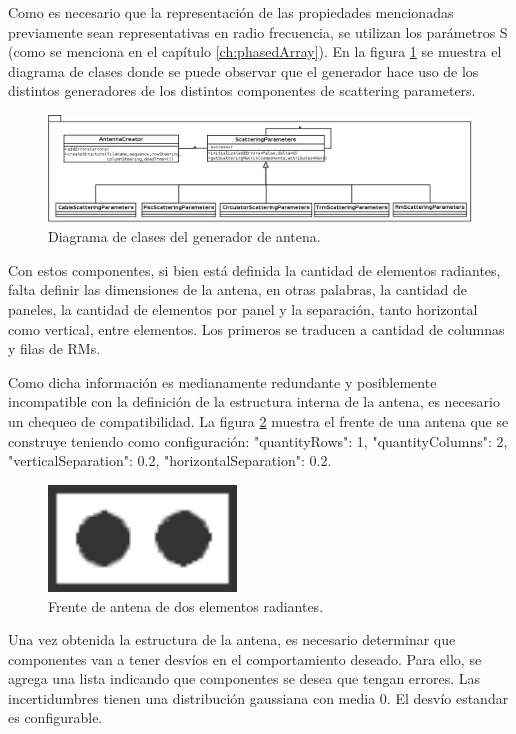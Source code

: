 Como es necesario que la representación de las propiedades mencionadas previamente sean representativas en radio frecuencia,
se utilizan los parámetros S (como se menciona en el capítulo \ref{ch:phasedArray}). En la figura \ref{fig:creationPackage} 
se muestra el diagrama de clases donde se puede observar que el generador hace uso de los distintos generadores de los 
distintos componentes de scattering parameters.

\begin{figure}
 \centering
 \includegraphics[width=15cm]{gfx/creationPackage.png}
 \caption{Diagrama de clases del generador de antena.}
 \label{fig:creationPackage}
\end{figure}

Con estos componentes, si bien está definida la cantidad de elementos radiantes, falta definir las dimensiones de la antena, 
en otras palabras, la cantidad de paneles, la cantidad de elementos por panel y la separación, tanto horizontal como vertical,
entre elementos. Los primeros se traducen a cantidad de columnas y filas de RMs. 

Como dicha información es medianamente redundante y posiblemente incompatible con la definición de la estructura interna de 
la antena, es necesario un chequeo de compatibilidad. La figura \ref{fig:frontAntenna} muestra el frente de una antena que se 
construye teniendo como configuración: "quantityRows": 1, "quantityColumns": 2, "verticalSeparation": 0.2, 
"horizontalSeparation": 0.2.

\begin{figure}
 \centering
 \includegraphics[width=5cm]{gfx/FrontAntenna2.png}
 \caption{Frente de antena de dos elementos radiantes.}
 \label{fig:frontAntenna}
\end{figure}

Una vez obtenida la estructura de la antena, es necesario determinar que componentes van a tener desvíos en el comportamiento 
deseado. Para ello, se agrega una lista indicando que componentes se desea que tengan errores. Las incertidumbres tienen una 
distribución gaussiana con media 0. El desvío estandar es configurable.

